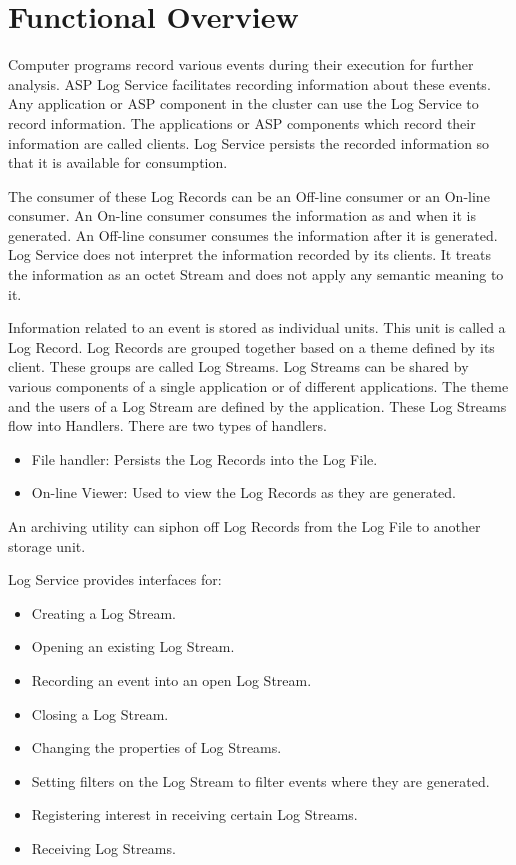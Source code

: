 \hypertarget{group__group26}{
\chapter{Functional Overview}
\label{group__group26}
}


\begin{flushleft}

Computer programs record various events during their execution for further analysis. ASP Log Service facilitates recording information 
about these events. Any application or ASP component in the cluster can use the Log Service to record information. The applications or 
ASP components which record their information are called clients. Log Service persists the recorded information so that it is available for consumption. 
\par
The consumer of these Log Records can be an Off-line consumer or an 
On-line consumer. An On-line consumer consumes the information as and when it is generated. An Off-line consumer consumes the information after it is generated. 
Log Service does not interpret the information recorded by its clients. It treats the information as an octet Stream and does not apply any semantic meaning
to it.
\par
Information related to an event is stored as individual units. This unit is called a Log Record. Log Records are grouped together based on
a theme defined by its client. These groups are called Log Streams. Log Streams can be shared by various components of a single 
application or of different applications. The theme and the users of a Log Stream are defined by the application. These Log Streams flow
into Handlers. There are two types of handlers.
\begin{itemize}
\item
File handler: Persists the Log Records into the Log File. 
\item
On-line Viewer: Used to view the Log Records as they are generated. 
\end{itemize}
An archiving utility can siphon off Log Records from the Log File to another storage unit. 
\par
Log Service provides interfaces for:
\begin{itemize}
\item
Creating a Log Stream.
\item
Opening an existing Log Stream.
\item
Recording an event into an open Log Stream.
\item
Closing a Log Stream. 
\item
Changing the properties of Log Streams.
\item
Setting filters on the Log Stream to filter events where they are generated. 
\item
Registering interest in receiving certain Log Streams.
\item
Receiving Log Streams.
\end{itemize}




\end{flushleft}
